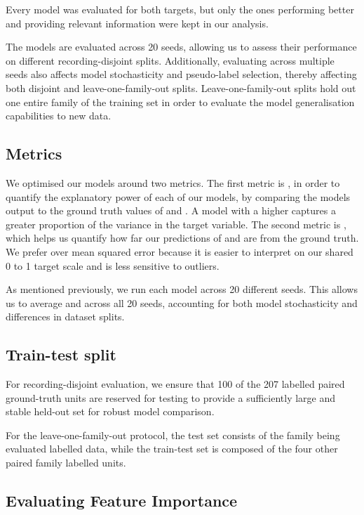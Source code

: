 Every model was evaluated for both targets, but only the ones performing better and providing relevant information were kept in our analysis.

The models are evaluated across 20 seeds, allowing us to assess their performance on different recording-disjoint splits. Additionally, evaluating across multiple seeds also affects model stochasticity and pseudo-label selection, thereby affecting both disjoint and leave-one-family-out splits. Leave-one-family-out splits hold out one entire family of the training set in order to evaluate the model generalisation capabilities to new data.

\subsection{Metrics}

We optimised our models around two metrics. The first metric is \rsq{}, in order to quantify the explanatory power of each of our models, by comparing the models output to the ground truth values of \fpos{} and \fmiss{}. A model with a higher \rsq{} captures a greater proportion of the variance in the target variable. The second metric is \mae{}, which helps us quantify how far our predictions of \fmiss{} and \fpos{} are from the ground truth. We prefer \mae{} over mean squared error because it is easier to interpret on our shared 0 to 1 target scale and is less sensitive to outliers.

As mentioned previously, we run each model across 20 different seeds. This allows us to average \rsq{} and \mae{} across all 20 seeds, accounting for both model stochasticity and differences in dataset splits.

\subsection{Train-test split}

For recording-disjoint evaluation, we ensure that 100 of the 207 labelled paired ground-truth units are reserved for testing to provide a sufficiently large and stable held-out set for robust model comparison. 

For the leave-one-family-out protocol, the test set consists of the family being evaluated labelled data, while the train-test set is composed of the four other paired family labelled units.

\subsection{Evaluating Feature Importance}

